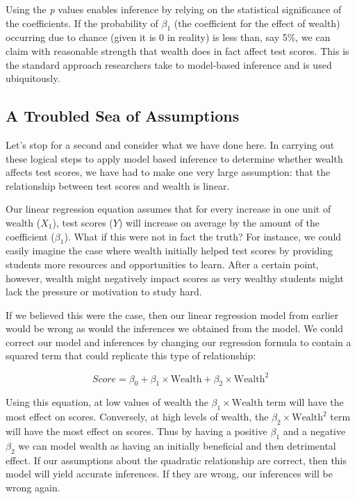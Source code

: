 \documentclass[]{memoir}
\begin{document}
Using the \emph{p} values enables inference by relying on the
statistical significance of the coefficients. If the probability of
$\beta_1$ (the coefficient for the effect of wealth) occurring due to
chance (given it is 0 in reality) is less than, say 5\%, we can claim
with reasonable strength that wealth does in fact affect test scores.
This is the standard approach researchers take to model-based inference
and is used ubiquitously.

\subsection{A Troubled Sea of Assumptions}

Let's stop for a second and consider what we have done here. In carrying
out these logical steps to apply model based inference to determine
whether wealth affects test scores, we have had to make one very large
assumption: that the relationship between test scores and wealth is
linear.

Our linear regression equation assumes that for every increase in one
unit of wealth ($X_1$), test scores ($Y$) will increase on average by
the amount of the coefficient ($\beta_1$). What if this were not in fact
the truth? For instance, we could easily imagine the case where wealth
initially helped test scores by providing students more resources and
opportunities to learn. After a certain point, however, wealth might
negatively impact scores as very wealthy students might lack the
pressure or motivation to study hard.

If we believed this were the case, then our linear regression model from
earlier would be wrong as would the inferences we obtained from the
model. We could correct our model and inferences by changing our
regression formula to contain a squared term that could replicate this
type of relationship:

\[ Score = \beta_0 + \beta_1 \times \text{Wealth} + \beta_2 \times \text{Wealth}^2 \]

Using this equation, at low values of wealth the
$\beta_1 \times \text{Wealth}$ term will have the most effect on scores.
Conversely, at high levels of wealth, the
$\beta_2 \times \text{Wealth}^2$ term will have the most effect on
scores. Thus by having a positive $\beta_1$ and a negative $\beta_2$ we
can model wealth as having an initially beneficial and then detrimental
effect. If our assumptions about the quadratic relationship are correct,
then this model will yield accurate inferences. If they are wrong, our
inferences will be wrong again.
\end{document}
